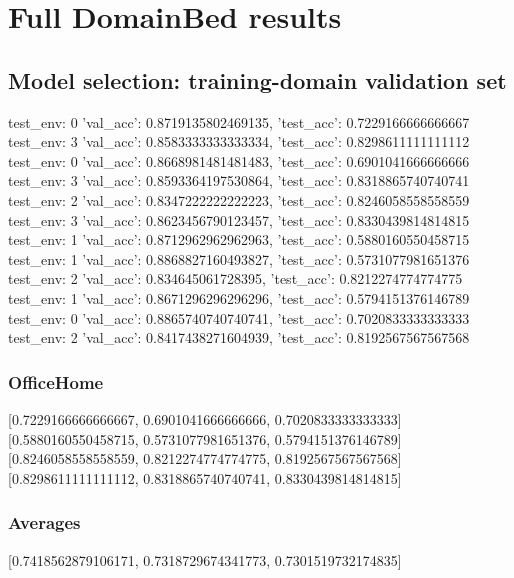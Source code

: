 \documentclass{article}
\begin{document}
\section{Full DomainBed results}

\subsection{Model selection: training-domain validation set}
test_env: 0
{'val_acc': 0.8719135802469135, 'test_acc': 0.7229166666666667}
test_env: 3
{'val_acc': 0.8583333333333334, 'test_acc': 0.8298611111111112}
test_env: 0
{'val_acc': 0.8668981481481483, 'test_acc': 0.6901041666666666}
test_env: 3
{'val_acc': 0.8593364197530864, 'test_acc': 0.8318865740740741}
test_env: 2
{'val_acc': 0.8347222222222223, 'test_acc': 0.8246058558558559}
test_env: 3
{'val_acc': 0.8623456790123457, 'test_acc': 0.8330439814814815}
test_env: 1
{'val_acc': 0.8712962962962963, 'test_acc': 0.5880160550458715}
test_env: 1
{'val_acc': 0.8868827160493827, 'test_acc': 0.5731077981651376}
test_env: 2
{'val_acc': 0.834645061728395, 'test_acc': 0.8212274774774775}
test_env: 1
{'val_acc': 0.8671296296296296, 'test_acc': 0.5794151376146789}
test_env: 0
{'val_acc': 0.8865740740740741, 'test_acc': 0.7020833333333333}
test_env: 2
{'val_acc': 0.8417438271604939, 'test_acc': 0.8192567567567568}

\subsubsection{OfficeHome}
[0.7229166666666667, 0.6901041666666666, 0.7020833333333333]
[0.5880160550458715, 0.5731077981651376, 0.5794151376146789]
[0.8246058558558559, 0.8212274774774775, 0.8192567567567568]
[0.8298611111111112, 0.8318865740740741, 0.8330439814814815]

\begin{center}
\end{center}

\subsubsection{Averages}
[0.7418562879106171, 0.7318729674341773, 0.7301519732174835]

\begin{center}
\end{center}
\end{document}
